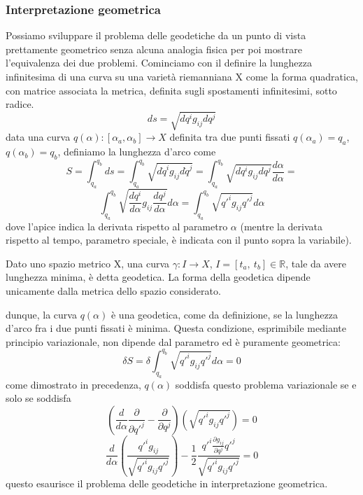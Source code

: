 \documentclass[
10pt, %
a4paper, %
oneside, %
headinclude,footinclude, %
BCOR5mm, %
]{scrartcl}
\begin{document}
\subsubsection{Interpretazione geometrica}
Possiamo sviluppare il problema delle geodetiche da un punto di vista prettamente geometrico senza alcuna analogia fisica per poi mostrare l'equivalenza dei due problemi. Cominciamo con il definire la lunghezza infinitesima di una curva su una varietà riemanniana X come la forma quadratica, con matrice associata la metrica, definita sugli spostamenti infinitesimi, sotto radice.
\[ds = \sqrt{d{q}^ig_{ij}d{q}^j}\] 
data una curva $q(\alpha): [\alpha_a, \alpha_b]\rightarrow X$ definita tra due punti fissati \(q(\alpha_a) = q_a\), \(q(\alpha_b) = q_b\), definiamo la lunghezza d'arco come
\[S =\int_{q_a}^{q_b}ds = \int_{q_a}^{q_b}\sqrt{d\dot{q}^ig_{ij}d\dot{q}^j}= \int_{q_a}^{q_b}\sqrt{d{q}^ig_{ij}d{q}^j} \frac{d\alpha}{d\alpha} =\] \[\int_{q_a}^{q_b}\sqrt{\frac{d{q}^i}{d\alpha}g_{ij}\frac{d{q}^j}{d\alpha}}d\alpha = \int_{q_a}^{q_b}\sqrt{q'^ig_{ij}q'^j}d\alpha \]  
dove l'apice indica la derivata rispetto al parametro $\alpha$ (mentre la derivata rispetto al tempo, parametro speciale, è indicata con il punto sopra la variabile).
\begin{definizione}[geodetica]
	Dato uno spazio metrico X, una curva $\gamma: I\rightarrow X$, \(I=[t_a,\ t_b]\in \mathbb{R}\), tale da avere lunghezza minima, è detta geodetica. La forma della geodetica dipende unicamente dalla metrica dello spazio considerato.
\end{definizione}
dunque, la curva \(q(\alpha)\) è una geodetica, come da definizione, se la lunghezza d'arco fra i due punti fissati è minima. Questa condizione, esprimibile mediante principio variazionale, non dipende dal parametro ed è puramente geometrica:
\[\delta S = \delta\int_{q_a}^{q_b}\sqrt{q'^ig_{ij}q'^j}d\alpha = 0\]
come dimostrato in precedenza, \(q(\alpha)\) soddisfa questo problema variazionale se e solo se soddisfa
\[\left(\frac{d}{d\alpha}\frac{\partial }{\partial q'^j}-\frac{\partial }{\partial q^j}\right)\left(\sqrt{q'^ig_{ij}q'^j}\right) = 0\]
\[\frac{d}{d\alpha}\left(\frac{q'^ig_{ij}}{\sqrt{q'^ig_{ij}q'^j}}\right)-\frac{1}{2}\frac{q'^i\frac{\partial g_{ij}}{\partial q^j}q'^j}{\sqrt{q'^ig_{ij}q'^j}} = 0\]
questo esaurisce il problema delle geodetiche in interpretazione geometrica.\\
\end{document}

